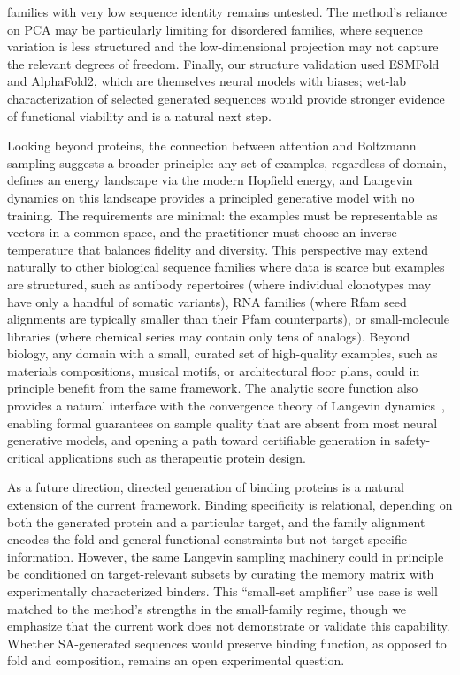 families with very low sequence identity remains untested. The method's reliance on PCA may be particularly limiting for disordered families, where sequence variation is less structured and the low-dimensional projection may not capture the relevant degrees of freedom. Finally, our structure validation used ESMFold and AlphaFold2, which are themselves neural models with biases; wet-lab characterization of selected generated sequences would provide stronger evidence of functional viability and is a natural next step.

Looking beyond proteins, the connection between attention and Boltzmann sampling suggests a broader principle: any set of examples, regardless of domain, defines an energy landscape via the modern Hopfield energy, and Langevin dynamics on this landscape provides a principled generative model with no training. The requirements are minimal: the examples must be representable as vectors in a common space, and the practitioner must choose an inverse temperature that balances fidelity and diversity. This perspective may extend naturally to other biological sequence families where data is scarce but examples are structured, such as antibody repertoires (where individual clonotypes may have only a handful of somatic variants), RNA families (where Rfam seed alignments are typically smaller than their Pfam counterparts), or small-molecule libraries (where chemical series may contain only tens of analogs). Beyond biology, any domain with a small, curated set of high-quality examples, such as materials compositions, musical motifs, or architectural floor plans, could in principle benefit from the same framework. The analytic score function also provides a natural interface with the convergence theory of Langevin dynamics~\cite{durmusNonasymptoticAnalysisUnadjusted2017,dalalyanTheoreticalGuaranteesApproximate2017}, enabling formal guarantees on sample quality that are absent from most neural generative models, and opening a path toward certifiable generation in safety-critical applications such as therapeutic protein design.

As a future direction, directed generation of binding proteins is a natural extension of the current framework. Binding specificity is relational, depending on both the generated protein and a particular target, and the family alignment encodes the fold and general functional constraints but not target-specific information. However, the same Langevin sampling machinery could in principle be conditioned on target-relevant subsets by curating the memory matrix with experimentally characterized binders. This ``small-set amplifier'' use case is well matched to the method's strengths in the small-family regime, though we emphasize that the current work does not demonstrate or validate this capability. Whether SA-generated sequences would preserve binding function, as opposed to fold and composition, remains an open experimental question.

